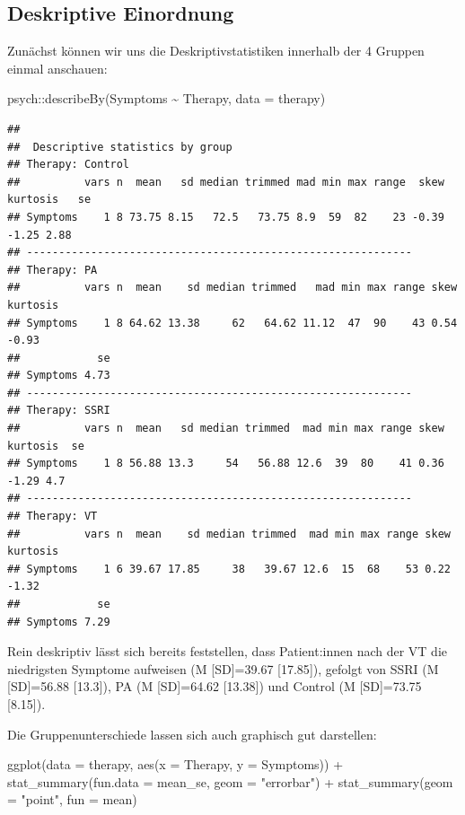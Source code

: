 \documentclass[
]{book}
\newenvironment{Shaded}{\begin{snugshade}}{\end{snugshade}}
\newcommand{\AttributeTok}[1]{\textcolor[rgb]{0.77,0.63,0.00}{#1}}
\newcommand{\FunctionTok}[1]{\textcolor[rgb]{0.00,0.00,0.00}{#1}}
\newcommand{\NormalTok}[1]{#1}
\newcommand{\SpecialCharTok}[1]{\textcolor[rgb]{0.00,0.00,0.00}{#1}}
\newcommand{\StringTok}[1]{\textcolor[rgb]{0.31,0.60,0.02}{#1}}
\begin{document}
\hypertarget{deskriptive-einordnung-4}{%
\subsection{Deskriptive Einordnung}\label{deskriptive-einordnung-4}}

Zunächst können wir uns die Deskriptivstatistiken innerhalb der 4 Gruppen einmal anschauen:

\begin{Shaded}
\begin{Highlighting}[]
\NormalTok{psych}\SpecialCharTok{::}\FunctionTok{describeBy}\NormalTok{(Symptoms }\SpecialCharTok{\textasciitilde{}}\NormalTok{ Therapy, }\AttributeTok{data =}\NormalTok{ therapy)}
\end{Highlighting}
\end{Shaded}

\begin{verbatim}
## 
##  Descriptive statistics by group 
## Therapy: Control
##          vars n  mean   sd median trimmed mad min max range  skew kurtosis   se
## Symptoms    1 8 73.75 8.15   72.5   73.75 8.9  59  82    23 -0.39    -1.25 2.88
## ------------------------------------------------------------ 
## Therapy: PA
##          vars n  mean    sd median trimmed   mad min max range skew kurtosis
## Symptoms    1 8 64.62 13.38     62   64.62 11.12  47  90    43 0.54    -0.93
##            se
## Symptoms 4.73
## ------------------------------------------------------------ 
## Therapy: SSRI
##          vars n  mean   sd median trimmed  mad min max range skew kurtosis  se
## Symptoms    1 8 56.88 13.3     54   56.88 12.6  39  80    41 0.36    -1.29 4.7
## ------------------------------------------------------------ 
## Therapy: VT
##          vars n  mean    sd median trimmed  mad min max range skew kurtosis
## Symptoms    1 6 39.67 17.85     38   39.67 12.6  15  68    53 0.22    -1.32
##            se
## Symptoms 7.29
\end{verbatim}

Rein deskriptiv lässt sich bereits feststellen, dass Patient:innen nach der VT die niedrigsten Symptome aufweisen (M {[}SD{]}=39.67 {[}17.85{]}), gefolgt von SSRI (M {[}SD{]}=56.88 {[}13.3{]}), PA (M {[}SD{]}=64.62 {[}13.38{]}) und Control (M {[}SD{]}=73.75 {[}8.15{]}).

Die Gruppenunterschiede lassen sich auch graphisch gut darstellen:

\begin{Shaded}
\begin{Highlighting}[]
\FunctionTok{ggplot}\NormalTok{(}\AttributeTok{data =}\NormalTok{ therapy, }\FunctionTok{aes}\NormalTok{(}\AttributeTok{x =}\NormalTok{ Therapy, }\AttributeTok{y =}\NormalTok{ Symptoms)) }\SpecialCharTok{+}
  \FunctionTok{stat\_summary}\NormalTok{(}\AttributeTok{fun.data =}\NormalTok{ mean\_se,  }\AttributeTok{geom =} \StringTok{"errorbar"}\NormalTok{) }\SpecialCharTok{+}
  \FunctionTok{stat\_summary}\NormalTok{(}\AttributeTok{geom =} \StringTok{"point"}\NormalTok{, }\AttributeTok{fun =}\NormalTok{ mean) }
\end{Highlighting}
\end{Shaded}
\end{document}
